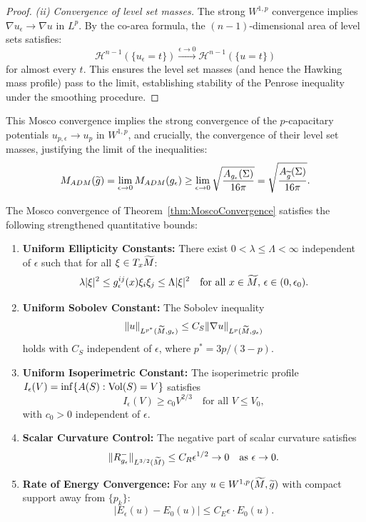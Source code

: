 \begin{proof}
\textit{(ii) Convergence of level set masses.}
The strong $W^{1,p}$ convergence implies $\nabla u_\epsilon \to \nabla u$ in $L^p$. By the co-area formula, the $(n-1)$-dimensional area of level sets satisfies:
\[
    \mathcal{H}^{n-1}(\{u_\epsilon = t\}) \xrightarrow{\epsilon \to 0} \mathcal{H}^{n-1}(\{u = t\})
\]
for almost every $t$. This ensures the level set masses (and hence the Hawking mass profile) pass to the limit, establishing stability of the Penrose inequality under the smoothing procedure.
\end{proof}

This Mosco convergence implies the strong convergence of the $p$-capacitary potentials $u_{p, \epsilon} \to u_p$ in $W^{1,p}$, and crucially, the convergence of their level set masses, justifying the limit of the inequalities:
\[ M_{ADM}(\widetilde{g}) = \lim_{\epsilon \to 0} M_{ADM}(g_{\epsilon}) \ge \lim_{\epsilon \to 0} \sqrt{\frac{A_{g_{\epsilon}}(\Sigma)}{16\pi}} = \sqrt{\frac{A_{\widetilde{g}}(\Sigma)}{16\pi}}. \]

\begin{theorem}\label{thm:UniformMoscoControl}
The Mosco convergence of Theorem~\ref{thm:MoscoConvergence} satisfies the following strengthened quantitative bounds:
\begin{enumerate}
    \item \textbf{Uniform Ellipticity Constants:} There exist $0 < \lambda \le \Lambda < \infty$ independent of $\epsilon$ such that for all $\xi \in T_x\widetilde{M}$:
    \[
    \lambda |\xi|^2 \le g_\epsilon^{ij}(x) \xi_i \xi_j \le \Lambda |\xi|^2 \quad \text{for all } x \in \widetilde{M}, \, \epsilon \in (0, \epsilon_0).
    \]
    \item \textbf{Uniform Sobolev Constant:} The Sobolev inequality
    \[
    \|u\|_{L^{p^*}(\widetilde{M}, g_\epsilon)} \le C_S \|\nabla u\|_{L^p(\widetilde{M}, g_\epsilon)}
    \]
    holds with $C_S$ independent of $\epsilon$, where $p^* = 3p/(3-p)$.
    \item \textbf{Uniform Isoperimetric Constant:} The isoperimetric profile $I_\epsilon(V) = \inf\{A(S) : \operatorname{Vol}(S) = V\}$ satisfies
    \[
    I_\epsilon(V) \ge c_0 V^{2/3} \quad \text{for all } V \le V_0,
    \]
    with $c_0 > 0$ independent of $\epsilon$.
    \item \textbf{Scalar Curvature Control:} The negative part of scalar curvature satisfies
    \[
    \|R_{g_\epsilon}^-\|_{L^{3/2}(\widetilde{M})} \le C_R \epsilon^{1/2} \to 0 \quad \text{as } \epsilon \to 0.
    \]
    \item \textbf{Rate of Energy Convergence:} For any $u \in W^{1,p}(\widetilde{M}, \widetilde{g})$ with compact support away from $\{p_k\}$:
    \[
    |E_\epsilon(u) - E_0(u)| \le C_E \epsilon \cdot E_0(u).
    \]
\end{enumerate}
\end{theorem}

